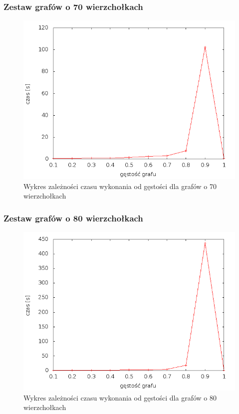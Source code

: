 \documentclass[12pt, a4paper]{article}
\begin{document}
\subsubsection*{Zestaw grafów o 70 wierzchołkach}
\begin{figure}[!h]
    \begin{center}
	\includegraphics[scale=0.5]{../experiment_1/img/dim/dim_70.png}
	\caption{Wykres zależności czasu wykonania od gęstości dla grafów o 70 wierzchołkach}
    \end{center}
\end{figure}
\FloatBarrier
\subsubsection*{Zestaw grafów o 80 wierzchołkach}
\begin{figure}[!h]
    \begin{center}
	\includegraphics[scale=0.5]{../experiment_1/img/dim/dim_80.png}
	\caption{Wykres zależności czasu wykonania od gęstości dla grafów o 80 wierzchołkach}
    \end{center}
\end{figure}
\FloatBarrier
\newpage
\end{document}
